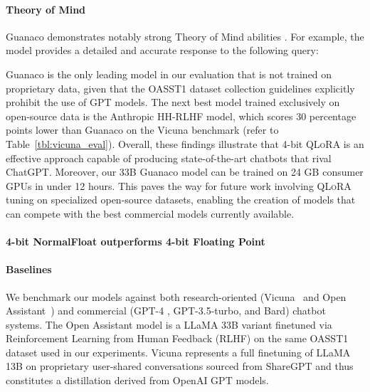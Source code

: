 \paragraph{Theory of Mind} {Guanaco} demonstrates notably strong Theory of Mind abilities \cite{nematzadeh2018evaluating, sap2022neural}. For example, the model provides a detailed and accurate response to the following query:

{Guanaco} is the only leading model in our evaluation that is not trained on proprietary data, given that the OASST1 dataset collection guidelines explicitly prohibit the use of GPT models. The next best model trained exclusively on open-source data is the Anthropic HH-RLHF model, which scores 30 percentage points lower than {Guanaco} on the Vicuna benchmark (refer to Table~\ref{tbl:vicuna_eval}). Overall, these findings illustrate that 4-bit \textsc{QLoRA} is an effective approach capable of producing state-of-the-art chatbots that rival ChatGPT. Moreover, our 33B {Guanaco} model can be trained on 24 GB consumer GPUs in under 12 hours. This paves the way for future work involving \textsc{QLoRA} tuning on specialized open-source datasets, enabling the creation of models that can compete with the best commercial models currently available.

\paragraph{4-bit NormalFloat outperforms 4-bit Floating Point}



\paragraph{Baselines} We benchmark our models against both research-oriented (Vicuna~\citep{vicuna2023} and Open Assistant~\citep{kopf2023openassistant}) and commercial (GPT-4 \citep{openai2023gpt}, GPT-3.5-turbo, and Bard) chatbot systems. The Open Assistant model is a LLaMA 33B variant finetuned via Reinforcement Learning from Human Feedback (RLHF) on the same OASST1 dataset used in our experiments. Vicuna represents a full finetuning of LLaMA 13B on proprietary user-shared conversations sourced from ShareGPT and thus constitutes a distillation derived from OpenAI GPT models.